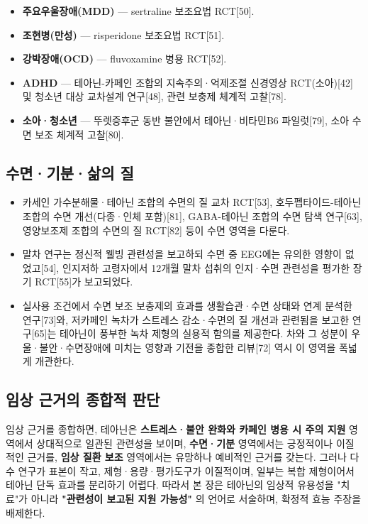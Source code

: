 \documentclass[11pt,oneside]{book}
\begin{document}
\begin{itemize}[leftmargin=6mm,itemsep=1pt,topsep=2pt]
  \item \textbf{주요우울장애(MDD)} — sertraline 보조요법 RCT[50].
  \item \textbf{조현병(만성)} — risperidone 보조요법 RCT[51].
  \item \textbf{강박장애(OCD)} — fluvoxamine 병용 RCT[52].
  \item \textbf{ADHD} — 테아닌-카페인 조합의 지속주의·억제조절 신경영상 RCT(소아)[42] 및 청소년 대상 교차설계 연구[48], 관련 보충제 체계적 고찰[78].
  \item \textbf{소아·청소년} — 뚜렛증후군 동반 불안에서 테아닌·비타민B6 파일럿[79], 소아 수면 보조 체계적 고찰[80].
\end{itemize}
\subsection{수면·기분·삶의 질}
\begin{itemize}[leftmargin=6mm,itemsep=1pt,topsep=2pt]
  \item 카세인 가수분해물·테아닌 조합의 수면의 질 교차 RCT[53], 호두펩타이드-테아닌 조합의 수면 개선(다종·인체 포함)[81], GABA-테아닌 조합의 수면 탐색 연구[63], 영양보조제 조합의 수면의 질 RCT[82] 등이 수면 영역을 다룬다.
  \item 말차 연구는 정신적 웰빙 관련성을 보고하되 수면 중 EEG에는 유의한 영향이 없었고[54], 인지저하 고령자에서 12개월 말차 섭취의 인지·수면 관련성을 평가한 장기 RCT[55]가 보고되었다.
  \item 실사용 조건에서 수면 보조 보충제의 효과를 생활습관·수면 상태와 연계 분석한 연구[73]와, 저카페인 녹차가 스트레스 감소·수면의 질 개선과 관련됨을 보고한 연구[65]는 테아닌이 풍부한 녹차 제형의 실용적 함의를 제공한다. 차와 그 성분이 우울·불안·수면장애에 미치는 영향과 기전을 종합한 리뷰[72] 역시 이 영역을 폭넓게 개관한다.
\end{itemize}
\subsection{임상 근거의 종합적 판단}
임상 근거를 종합하면, 테아닌은 \textbf{스트레스·불안 완화와 카페인 병용 시 주의 지원} 영역에서 상대적으로 일관된 관련성을 보이며, \textbf{수면·기분} 영역에서는 긍정적이나 이질적인 근거를, \textbf{임상 질환 보조} 영역에서는 유망하나 예비적인 근거를 갖는다. 그러나 다수 연구가 표본이 작고, 제형·용량·평가도구가 이질적이며, 일부는 복합 제형이어서 테아닌 단독 효과를 분리하기 어렵다. 따라서 본 장은 테아닌의 임상적 유용성을 "치료"가 아니라 \textbf{"관련성이 보고된 지원 가능성"} 의 언어로 서술하며, 확정적 효능 주장을 배제한다.
\end{document}
